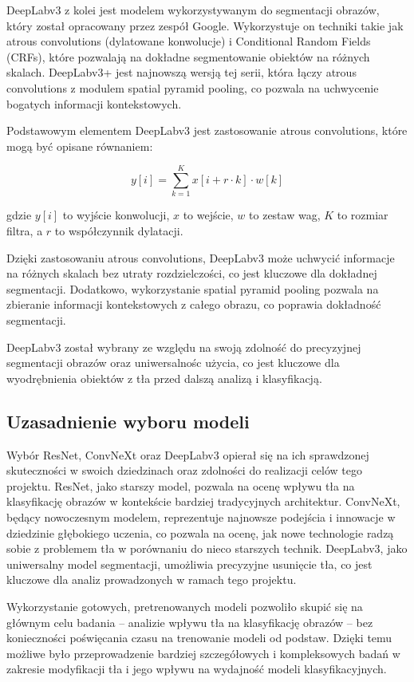 DeepLabv3 z kolei jest modelem wykorzystywanym do segmentacji obrazów, który został opracowany przez zespół Google. Wykorzystuje on techniki takie jak atrous convolutions (dylatowane konwolucje) i Conditional Random Fields (CRFs), które 
pozwalają na dokładne segmentowanie obiektów na różnych skalach. DeepLabv3+ jest najnowszą wersją tej serii, która łączy atrous convolutions z modulem spatial pyramid pooling, co pozwala na uchwycenie bogatych informacji kontekstowych.

Podstawowym elementem DeepLabv3 jest zastosowanie atrous convolutions, które mogą być opisane równaniem:

\begin{equation}
y[i] = \sum_{k=1}^{K} x[i + r \cdot k] \cdot w[k]
\end{equation}

gdzie \( y[i] \) to wyjście konwolucji, \( x \) to wejście, \( w \) to zestaw wag, \( K \) to rozmiar filtra, a \( r \) 
to współczynnik dylatacji.

Dzięki zastosowaniu atrous convolutions, DeepLabv3 może uchwycić informacje na różnych skalach bez utraty rozdzielczości, co jest kluczowe dla dokładnej segmentacji. Dodatkowo, wykorzystanie spatial pyramid pooling pozwala na 
zbieranie informacji kontekstowych z całego obrazu, co poprawia dokładność segmentacji.

DeepLabv3 został wybrany ze względu na swoją zdolność do precyzyjnej segmentacji obrazów oraz uniwersalnośc użycia, co jest kluczowe dla wyodrębnienia obiektów z tła przed dalszą analizą i klasyfikacją.

\subsection*{Uzasadnienie wyboru modeli}

Wybór ResNet, ConvNeXt oraz DeepLabv3 opierał się na ich sprawdzonej skuteczności w swoich dziedzinach oraz zdolności do realizacji celów tego projektu. ResNet, jako starszy model, pozwala na ocenę wpływu tła na klasyfikację obrazów w 
kontekście bardziej tradycyjnych architektur. ConvNeXt, będący nowoczesnym modelem, reprezentuje najnowsze podejścia i innowacje w dziedzinie głębokiego uczenia, co pozwala na ocenę, jak nowe technologie radzą sobie z problemem tła w porównaniu
do nieco starszych technik. DeepLabv3, jako uniwersalny model segmentacji, umożliwia precyzyjne usunięcie tła, co jest kluczowe dla analiz prowadzonych w ramach tego projektu.

Wykorzystanie gotowych, pretrenowanych modeli pozwoliło skupić się na głównym celu badania – analizie wpływu tła na klasyfikację obrazów – bez konieczności poświęcania czasu na trenowanie modeli od podstaw. Dzięki temu możliwe było 
przeprowadzenie bardziej szczegółowych i kompleksowych badań w zakresie modyfikacji tła i jego wpływu na wydajność modeli klasyfikacyjnych.

